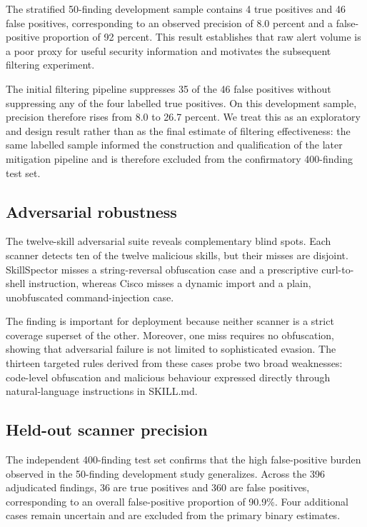 \documentclass[conference]{IEEEtran}
\begin{document}
The stratified 50-finding development sample contains 4 true positives and 46 false positives, corresponding to an observed precision of 8.0 percent and a false-positive proportion of 92 percent. This result establishes that raw alert volume is a poor proxy for useful security information and motivates the subsequent filtering experiment.

The initial filtering pipeline suppresses 35 of the 46 false positives without suppressing any of the four labelled true positives. On this development sample, precision therefore rises from 8.0 to 26.7 percent. We treat this as an exploratory and design result rather than as the final estimate of filtering effectiveness: the same labelled sample informed the construction and qualification of the later mitigation pipeline and is therefore excluded from the confirmatory 400-finding test set.

\subsection{Adversarial robustness}

The twelve-skill adversarial suite reveals complementary blind spots. Each scanner detects ten of the twelve malicious skills, but their misses are disjoint. SkillSpector misses a string-reversal obfuscation case and a prescriptive curl-to-shell instruction, whereas Cisco misses a dynamic import and a plain, unobfuscated command-injection case.

The finding is important for deployment because neither scanner is a strict coverage superset of the other. Moreover, one miss requires no obfuscation, showing that adversarial failure is not limited to sophisticated evasion. The thirteen targeted rules derived from these cases probe two broad weaknesses: code-level obfuscation and malicious behaviour expressed directly through natural-language instructions in SKILL.md.

\subsection{Held-out scanner precision}

The independent 400-finding test set confirms that the high false-positive burden observed in the 50-finding development study generalizes. Across the 396 adjudicated findings, 36 are true positives and 360 are false positives, corresponding to an overall false-positive proportion of 90.9\%. Four additional cases remain uncertain and are excluded from the primary binary estimates.
\end{document}
